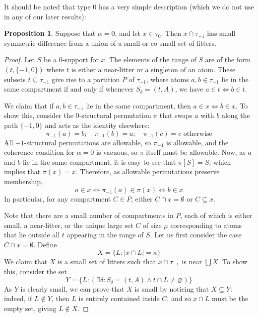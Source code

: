 \documentclass{article}
\newif\ifshowannotations
\newcommand{\annot}[1]{\ifshowannotations\marginpar{#1}\fi}
\theoremstyle{definition}
\newtheorem{proposition}[theorem]{Proposition}
\theoremstyle{remark}
\begin{document}
{%
It should be noted that type 0 has a very simple description (which we do not use in any of our later results):
\begin{proposition}\label{prop:minus_one_extension}
  Suppose that $\alpha = 0$, and let $x \in \tau_0$.
  Then $x \cap \tau_{-1}$ has small symmetric difference from a union of a small or co-small set of litters.
\end{proposition}
\begin{proof}
  Let $S$ be a $0$-support for $x$.
  The elements of the range of $S$ are of the form $(t, \{-1,0\})$ where $t$ is either a near-litter or a singleton of an atom.
  These subsets $t \subseteq \tau_{-1}$ give rise to a partition $P$ of $\tau_{-1}$, where atoms $a, b \in \tau_{-1}$ lie in the same compartment if and only if whenever $S_\delta = (t, A)$, we have $a \in t \iff b \in t$.

  We claim that if $a, b \in \tau_{-1}$ lie in the same compartment, then $a \in x \iff b \in x$.
  To show this, consider the $0$-structural permutation $\pi$ that swaps $a$ with $b$ along the path $\{-1,0\}$ and acts as the identity elsewhere:
  $$ \pi_{-1}(a) = b;\quad \pi_{-1}(b) = a;\quad \pi_{-1}(c) = c \text{ otherwise} $$
  All $-1$-structural permutations are allowable, so $\pi_{-1}$ is allowable, and the coherence condition for $\alpha = 0$ is vacuous, so $\pi$ itself must be allowable.
  Now, as $a$ and $b$ lie in the same compartment, it is easy to see that $\pi[S] = S$, which implies that $\pi(x) = x$.
  Therefore, as allowable permutations preserve membership,
  $$ a \in x \iff \pi_{-1}(a) \in \pi(x) \iff b \in x $$
  In particular, for any compartment $C \in P$, either $C \cap x = \emptyset$ or $C \subseteq x$.

  Note that there are a small number of compartments in $P$, each of which is either small, a near-litter, or the unique large set $C$ of size $\mu$ corresponding to atoms that lie outside all $t$ appearing in the range of $S$.
  Let us first consider the case $C \cap x = \emptyset$.
  Define
  $$ X = \{ L : |x \cap L| = \kappa \} $$
  We claim that $X$ is a small set of litters such that $x \cap \tau_{-1}$ is near $\bigcup X$.
  To show this, consider the set
  $$ Y = \{ L : (\exists \delta : S_\delta = (t, A) \wedge t \cap L \neq \varnothing) \} $$
  As $Y$ is clearly small, we can prove that $X$ is small by noticing that $X \subseteq Y$: indeed, if $L \notin Y$, then $L$ is entirely contained inside $C$, and so $x \cap L$ must be the empty set, giving $L \notin X$.


\end{proof}}
\end{document}
